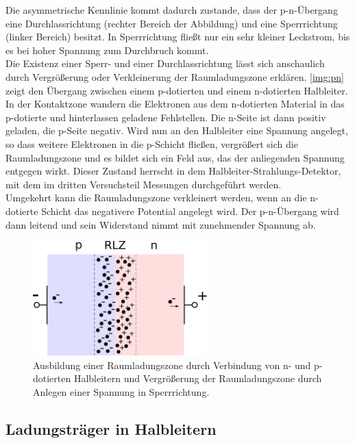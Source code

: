 Die asymmetrische Kennlinie kommt dadurch zustande,
dass der p-n-Übergang eine Durchlassrichtung (rechter Bereich der Abbildung) und eine Sperrrichtung
(linker Bereich) besitzt.
In Sperrrichtung fließt nur ein sehr kleiner Leckstrom, bis es bei hoher Spannung zum Durchbruch kommt.\\
Die Existenz einer Sperr- und einer Durchlassrichtung lässt sich anschaulich durch Vergrößerung
oder Verkleinerung der Raumladungszone erklären.
\autoref{img:pn} zeigt den Übergang zwischen einem p-dotierten und einem n-dotierten Halbleiter.
In der Kontaktzone wandern die Elektronen aus dem n-dotierten Material in das p-dotierte und hinterlassen
geladene Fehlstellen.
Die n-Seite ist dann positiv geladen, die p-Seite negativ.
Wird nun an den Halbleiter eine Spannung angelegt, so dass weitere Elektronen in die p-Schicht fließen,
vergrößert sich die Raumladungszone und es bildet sich ein Feld aus,
das der anliegenden Spannung entgegen wirkt.
Dieser Zustand herrscht in dem Halbleiter-Strahlungs-Detektor,
mit dem im dritten Versuchsteil Messungen durchgeführt werden.\\
Umgekehrt kann die Raumladungszone verkleinert werden,
wenn an die n-dotierte Schicht das negativere Potential angelegt wird.
Der p-n-Übergang wird dann leitend und sein Widerstand nimmt mit zunehmender Spannung ab.
\begin{figure}[H]
\begin{center}
  \includegraphics[width=0.6\textwidth]{../img/pn.pdf}
  \caption{Ausbildung einer Raumladungszone durch Verbindung von n- und p-dotierten Halbleitern
  und Vergrößerung der Raumladungszone durch Anlegen einer Spannung in Sperrrichtung.}
  \label{img:pn}
\end{center}
\end{figure}

\subsection{Ladungsträger in Halbleitern}

